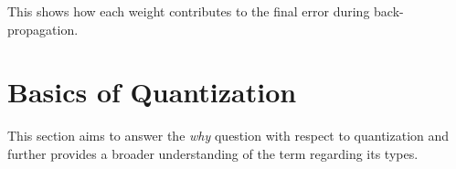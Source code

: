 \noindent This shows how each weight contributes to the final error during back-propagation.


\section{Basics of Quantization}
\label{sec:basicsofquantization}
This section aims to answer the \textit{why} question with respect to quantization and further provides a broader understanding of the term regarding its types.


